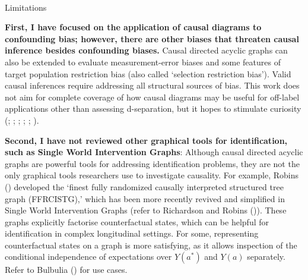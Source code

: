 \documentclass[
  single column]{article}
\makeatletter
\let\oldparagraph\paragraph
\renewcommand{\paragraph}{
    \@ifstar
      \xxxParagraphStar
      \xxxParagraphNoStar
  }
\newcommand{\xxxParagraphStar}[1]{\oldparagraph*{#1}\mbox{}}
\newcommand{\xxxParagraphNoStar}[1]{\oldparagraph{#1}\mbox{}}
\makeatother
\begin{document}
\paragraph{Limitations}\label{limitations}

\textbf{First, I have focused on the application of causal diagrams to
confounding bias; however, there are other biases that threaten causal
inference besides confounding biases.} Causal directed acyclic graphs
can also be extended to evaluate measurement-error biases and some
features of target population restriction bias (also called `selection
restriction bias'). Valid causal inferences require addressing all
structural sources of bias. This work does not aim for complete coverage
of how causal diagrams may be useful for off-label applications other
than assessing d-separation, but it hopes to stimulate curiosity
(;
;
;
;
;
).

\textbf{Second, I have not reviewed other graphical tools for
identification, such as Single World Intervention Graphs}: Although
causal directed acyclic graphs are powerful tools for addressing
identification problems, they are not the only graphical tools
researchers use to investigate causality. For example, Robins
() developed the `finest fully randomized
causally interpreted structured tree graph (FFRCISTG),' which has been
more recently revived and simplified in Single World Intervention Graphs
(refer to Richardson and Robins
()). These graphs
explicitly factorise counterfactual states, which can be helpful for
identification in complex longitudinal settings. For some, representing
counterfactual states on a graph is more satisfying, as it allows
inspection of the conditional independence of expectations over
\(Y(a^*)\) and \(Y(a)\) separately. Refer to Bulbulia
() for use cases.
\end{document}
